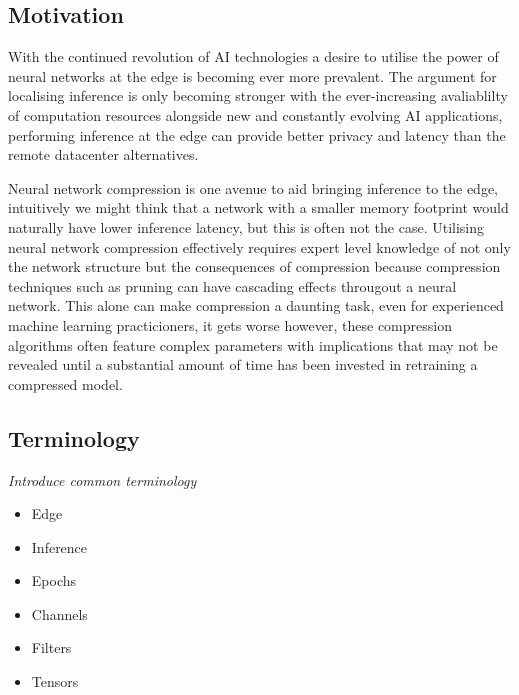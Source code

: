 \documentclass[../Dissertation.tex]{subfiles}
\begin{document}
\subsection{Motivation}
With the continued revolution of AI technologies a desire to utilise the power of neural networks at the edge is becoming ever more prevalent.
The argument for localising inference is only becoming stronger with the ever-increasing avaliablilty of computation resources alongside new and constantly evolving AI applications, performing inference at the edge can provide better privacy and latency than the remote datacenter alternatives.



Neural network compression is one avenue to aid bringing inference to the edge, intuitively we might think that a network with a smaller memory footprint would naturally have lower inference latency, but this is often not the case.
Utilising neural network compression effectively requires expert level knowledge of not only the network structure but the consequences of compression because compression techniques such as pruning can have cascading effects througout a neural network.
This alone can make compression a daunting task, even for experienced machine learning practicioners, it gets worse however, these compression algorithms often feature complex parameters with implications that may not be revealed until a substantial amount of time has been invested in retraining a compressed model.

\subsection{Terminology}
\emph{\color{red}Introduce common terminology}


\begin{itemize}
    \item Edge
    \item Inference
    \item Epochs
    \item Channels
    \item Filters
    \item Tensors
\end{itemize}
\end{document}
